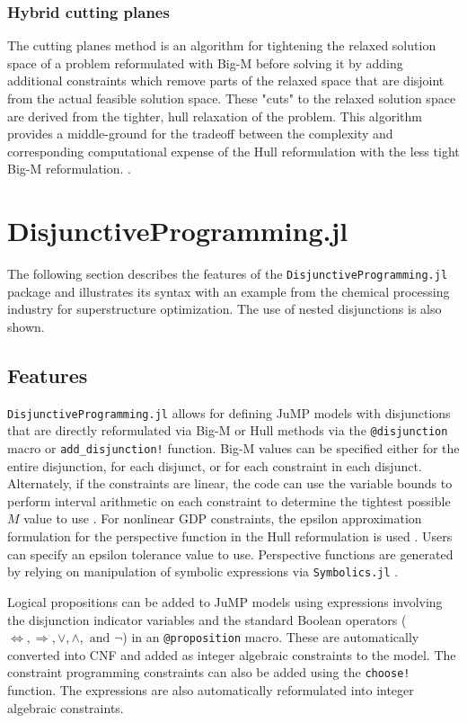 \documentclass{juliacon}
\begin{document}
\subsubsection{Hybrid cutting planes}
The cutting planes method is an algorithm for tightening the relaxed solution space of a problem reformulated with Big-M before solving it by adding additional constraints which remove parts of the relaxed space that are disjoint from the actual feasible solution space. These "cuts" to the relaxed solution space are derived from the tighter, hull relaxation of the problem. This algorithm provides a middle-ground for the tradeoff between the complexity and corresponding computational expense of the Hull reformulation with the less tight Big-M reformulation. \cite{trespalacios_grossmann_2016}. 
\vskip 6pt


\section{DisjunctiveProgramming.jl}
The following section describes the features of the \verb|DisjunctiveProgramming.jl| package and illustrates its syntax with an example from the chemical processing industry for superstructure optimization. The use of nested disjunctions is also shown.

\subsection{Features}
\verb|DisjunctiveProgramming.jl| allows for defining JuMP models with disjunctions that are directly reformulated via Big-M or Hull methods via the \verb|@disjunction| macro or \verb|add_disjunction!| function. Big-M values can be specified either for the entire disjunction, for each disjunct, or for each constraint in each disjunct. Alternately, if the constraints are linear, the code can use the variable bounds to perform interval arithmetic on each constraint to determine the tightest possible $M$ value to use \cite{agarwal2010automating}. For nonlinear GDP constraints, the epsilon approximation formulation for the perspective function in the Hull reformulation is used \cite{furman_sawaya_grossmann_2020}. Users can specify an epsilon tolerance value to use. Perspective functions are generated by relying on manipulation of symbolic expressions via \verb|Symbolics.jl| \cite{10.1145/3511528.3511535}.

\vskip 6pt
Logical propositions can be added to JuMP models using expressions involving the disjunction indicator variables and the standard Boolean operators ($\Leftrightarrow, \Rightarrow, \vee, \wedge, \text{ and } \neg$) in an \verb|@proposition| macro. These are automatically converted into CNF and added as integer algebraic constraints to the model. The constraint programming constraints can also be added using the \verb|choose!| function. The expressions are also automatically reformulated into integer algebraic constraints.
\end{document}
